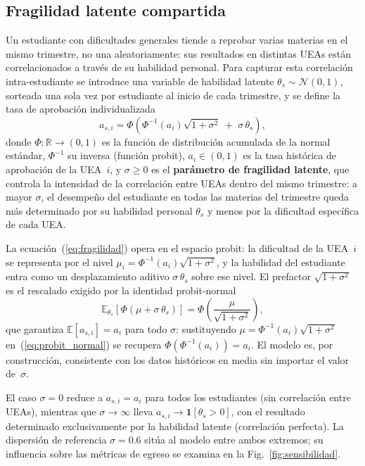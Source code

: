\documentclass[11pt,letterpaper]{article}
\begin{document}
\subsection{Fragilidad latente compartida}
\label{sec:fragilidad}

Un estudiante con dificultades generales tiende a reprobar varias materias
en el mismo trimestre, no una aleatoriamente: sus resultados en distintas
UEAs están correlacionados a través de su habilidad personal.
Para capturar esta correlación intra-estudiante se introduce una variable
de habilidad latente $\theta_s\sim\mathcal{N}(0,1)$, sorteada una sola vez
por estudiante al inicio de cada trimestre, y se define la tasa de
aprobación individualizada
\begin{equation}
  a_{s,i}
  = \Phi\!\left(
      \Phi^{-1}(a_i)\sqrt{1+\sigma^2} \;+\; \sigma\,\theta_s
    \right),
  \label{eq:fragilidad}
\end{equation}
donde $\Phi:\mathbb{R}\to(0,1)$ es la función de distribución acumulada
de la normal estándar, $\Phi^{-1}$ su inversa (función probit),
$a_i\in(0,1)$ es la tasa histórica de aprobación de la UEA~$i$, y
$\sigma\geq 0$ es el \textbf{parámetro de fragilidad latente}, que
controla la intensidad de la correlación entre UEAs dentro del mismo
trimestre: a mayor $\sigma$, el desempeño del estudiante en todas las
materias del trimestre queda más determinado por su habilidad personal
$\theta_s$ y menos por la dificultad específica de cada UEA.

La ecuación~(\ref{eq:fragilidad}) opera en el espacio probit: la
dificultad de la UEA~$i$ se representa por el nivel
$\mu_i = \Phi^{-1}(a_i)\sqrt{1+\sigma^2}$, y la habilidad del
estudiante entra como un desplazamiento aditivo $\sigma\,\theta_s$
sobre ese nivel.
El prefactor $\sqrt{1+\sigma^2}$ es el rescalado exigido por la
identidad probit-normal
\begin{equation}
  \mathbb{E}_{\theta_s}\!\left[
    \Phi\!\left(\mu + \sigma\,\theta_s\right)
  \right]
  = \Phi\!\left(\frac{\mu}{\sqrt{1+\sigma^2}}\right),
  \label{eq:probit_normal}
\end{equation}
que garantiza $\mathbb{E}[a_{s,i}] = a_i$ para todo $\sigma$:
sustituyendo $\mu = \Phi^{-1}(a_i)\sqrt{1+\sigma^2}$
en~(\ref{eq:probit_normal}) se recupera $\Phi(\Phi^{-1}(a_i)) = a_i$.
El modelo es, por construcción, consistente con los datos históricos
en media sin importar el valor de~$\sigma$.

El caso $\sigma=0$ reduce a $a_{s,i}=a_i$ para todos los estudiantes
(sin correlación entre UEAs), mientras que $\sigma\to\infty$ lleva
$a_{s,i}\to\mathbf{1}[\theta_s>0]$, con el resultado determinado
exclusivamente por la habilidad latente (correlación perfecta).
La dispersión de referencia $\sigma=0.6$ sitúa al modelo entre ambos
extremos; su influencia sobre las métricas de egreso se examina en
la Fig.~\ref{fig:sensibilidad}.
\end{document}
